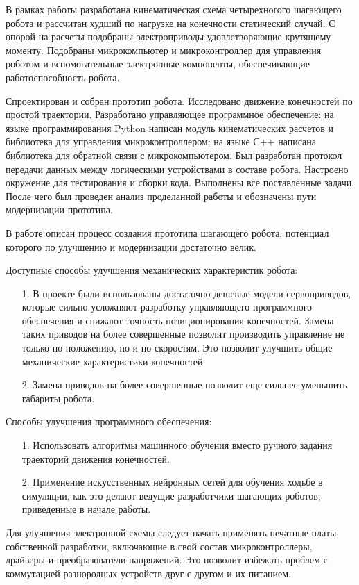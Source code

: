 
В рамках работы разработана кинематическая схема четырехногого шагающего робота и рассчитан худший по нагрузке на конечности статический случай. С опорой на расчеты подобраны электроприводы удовлетворяющие крутящему моменту. Подобраны микрокомпьютер и микроконтроллер для управления роботом и вспомогательные электронные компоненты, обеспечивающие работоспособность робота. 

Спроектирован и собран прототип робота. Исследовано движение конечностей по простой траектории. Разработано управляющее программное обеспечение: на языке программирования Python написан модуль кинематических расчетов и библиотека для управления микроконтроллером; на языке С++ написана библиотека для обратной связи с микрокомпьютером. Был разработан протокол передачи данных между логическими устройствами в составе робота. Настроено окружение для тестирования и сборки кода. Выполнены все поставленные задачи. После чего был проведен анализ проделанной работы и обозначены пути модернизации прототипа.

В работе описан процесс создания прототипа шагающего робота, потенциал которого по улучшению и модернизации достаточно велик.

Доступные способы улучшения механических характеристик робота:
\begin{itemize}
    \item[1.] В проекте были использованы достаточно дешевые модели сервоприводов, которые сильно усложняют разработку управляющего программного обеспечения и снижают точность позиционирования конечностей. Замена таких приводов на более совершенные позволит производить управление не только по положению, но и по скоростям. Это позволит улучшить общие механические характеристики конечностей.
    \item[2.] Замена приводов на более совершенные позволит еще сильнее уменьшить габариты робота. 
\end{itemize}

Способы улучшения программного обеспечения:
\begin{itemize}
    \item[1.] Использовать алгоритмы машинного обучения вместо ручного задания траекторий движения конечностей.
    \item[2.] Применение искусственных нейронных сетей для обучения ходьбе в симуляции, как это делают ведущие разработчики шагающих роботов, приведенные в начале работы. 
\end{itemize}

Для улучшения электронной схемы следует начать применять печатные платы собственной разработки, включающие в свой состав микроконтроллеры, драйверы и преобразователи напряжений. Это позволит избежать проблем с коммутацией разнородных устройств друг с другом и их питанием.